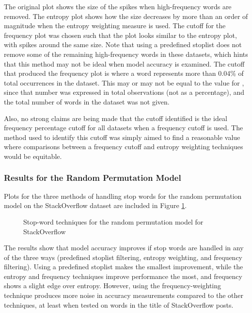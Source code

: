 \documentclass[man,floatsintext,donotrepeattitle]{apa6}
\begin{document}
The original plot shows the size of the spikes when high-frequency words are removed.
The entropy plot shows how the size decreases by more than an order of magnitude when the entropy weighting measure is used.
The cutoff for the frequency plot was chosen such that the plot looks similar to the entropy plot, with spikes around the same size.
Note that using a predefined stoplist does not remove some of the remaining high-frequency words in these datasets, which hints that this method may not be ideal when model accuracy is examined.
The cutoff that produced the frequency plot is where a word represents more than \num{.04}\% of total occurrences in the dataset.
This may or may not be equal to the value for \textcite{Sahlgren2008}, since that number was expressed in total observations (not as a percentage), and the total number of words in the dataset was not given.

Also, no strong claims are being made that the cutoff identified is the ideal frequency percentage cutoff for all datasets when a frequency cutoff is used.
The method used to identify this cutoff was simply aimed to find a reasonable value where comparisons between a frequency cutoff and entropy weighting techniques would be equitable.

\subsubsection{Results for the Random Permutation Model}

Plots for the three methods of handling stop words for the random permutation model on the StackOverflow dataset are included in Figure \ref{figContextStopRPSO}.

\begin{figure}[!htbp]
  \caption{Stop-word techniques for the random permutation model for StackOverflow}
  \label{figContextStopRPSO}
\end{figure}

The results show that model accuracy improves if stop words are handled in any of the three ways (predefined stoplist filtering, entropy weighting, and frequency filtering).
Using a predefined stoplist makes the smallest improvement, while the entropy and frequency techniques improve performance the most, and frequency shows a slight edge over entropy.
However, using the frequency-weighting technique produces more noise in accuracy measurements compared to the other techniques, at least when tested on words in the title of StackOverflow posts.
\end{document}
